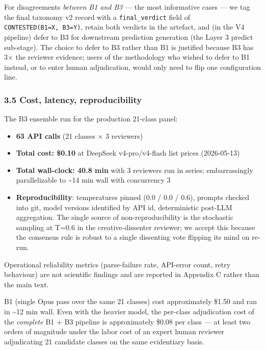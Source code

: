 \documentclass[
  letterpaper,
  11pt]{article}
\providecommand{\tightlist}{%
  \setlength{\itemsep}{0pt}\setlength{\parskip}{0pt}}
\begin{document}
For disagreements \emph{between B1 and B3} --- the most informative
cases --- we tag the final taxonomy v2 record with a
\texttt{final\_verdict} field of \texttt{CONTESTED(B1=X,\ B3=Y)}, retain
both verdicts in the artefact, and (in the V4 pipeline) defer to B3 for
downstream prediction generation (the Layer 3 predict sub-stage). The
choice to defer to B3 rather than B1 is justified because B3 has 3× the
reviewer evidence; users of the methodology who wished to defer to B1
instead, or to enter human adjudication, would only need to flip one
configuration line.

\subsubsection{3.5 Cost, latency,
reproducibility}\label{cost-latency-reproducibility}

The B3 ensemble run for the production 21-class panel:

\begin{itemize}
\tightlist
\item
  \textbf{63 API calls} (21 classes × 3 reviewers)
\item
  \textbf{Total cost: \$0.10} at DeepSeek v4-pro/v4-flash list prices
  (2026-05-13)
\item
  \textbf{Total wall-clock: 40.8 min} with 3 reviewers run in series;
  embarrassingly parallelizable to \textasciitilde14 min wall with
  concurrency 3
\item
  \textbf{Reproducibility}: temperatures pinned (0.0 / 0.0 / 0.6),
  prompts checked into git, model versions identified by API id,
  deterministic post-LLM aggregation. The single source of
  non-reproducibility is the stochastic sampling at T=0.6 in the
  creative-dissenter reviewer; we accept this because the consensus rule
  is robust to a single dissenting vote flipping its mind on re-run.
\end{itemize}

Operational reliability metrics (parse-failure rate, API-error count,
retry behaviour) are not scientific findings and are reported in
Appendix C rather than the main text.

B1 (single Opus pass over the same 21 classes) cost approximately \$1.50
and ran in \textasciitilde12 min wall. Even with the heavier model, the
per-class adjudication cost of the \emph{complete} B1 + B3 pipeline is
approximately \$0.08 per class --- at least two orders of magnitude
under the labor cost of an expert human reviewer adjudicating 21
candidate classes on the same evidentiary basis.
\end{document}
